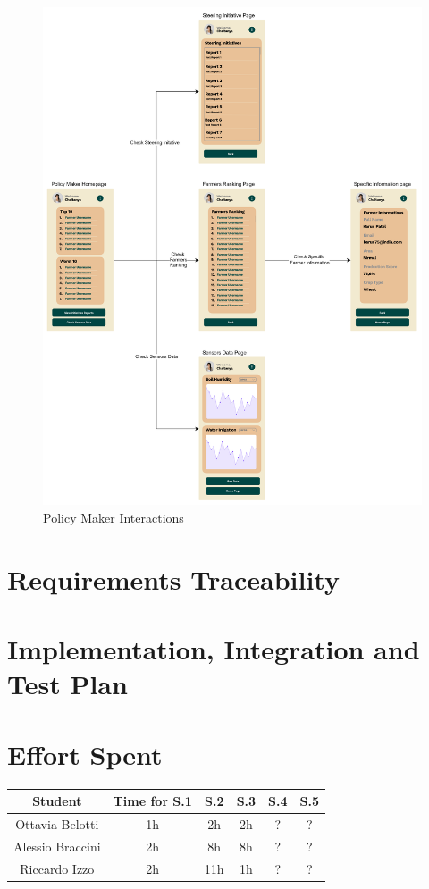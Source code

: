 \documentclass[table, 12pt]{article}
\begin{document}
\begin{center}
    \begin{figure}[H]
        \vspace{-100px}
        \includegraphics[scale=0.7, center]{assets/MockUp/PMInteractoins.png}
        \caption{Policy Maker Interactions}
        \label{fig: PMInter}
    \end{figure}
\end{center}
\section{Requirements Traceability}


\section{Implementation, Integration and Test Plan}

\newpage
\section{Effort Spent}
    \begin{tabular}{| c || c | c| c| c |c|}
        \hline
        Student & Time for S.1 & S.2 & S.3 & S.4 & S.5\\ \hline
        Ottavia Belotti & 1h & 2h & 2h & ? & ? \\
        Alessio Braccini & 2h & 8h & 8h & ?  & ? \\
        Riccardo Izzo & 2h & 11h & 1h & ?  & ? \\
        \hline
    \end{tabular}
\end{document}
